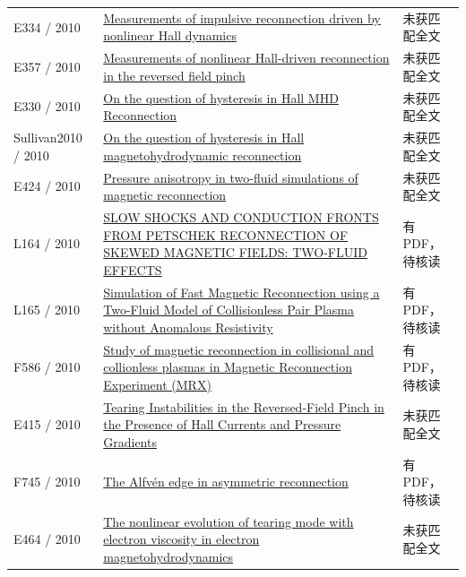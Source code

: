 \begin{longtable}{P{24mm}P{97mm}P{27mm}}
E334 / 2010 & \href{https://doi.org/10.1063/1.3521336}{Measurements of impulsive reconnection driven by nonlinear Hall dynamics} & 未获匹配全文\\

E357 / 2010 & \href{http://absimage.aps.org/image/DPP10/MWS_DPP10-2010-000419.pdf}{Measurements of nonlinear Hall-driven reconnection in the reversed field pinch} & 未获匹配全文\\

E330 / 2010 & \href{http://absimage.aps.org/image/DPP10/MWS_DPP10-2010-001121.pdf}{On the question of hysteresis in Hall MHD Reconnection} & 未获匹配全文\\

Sullivan2010 / 2010 & \href{https://doi.org/10.1063/1.3518752}{On the question of hysteresis in Hall magnetohydrodynamic reconnection} & 未获匹配全文\\

E424 / 2010 & \href{https://ui.adsabs.harvard.edu/abs/2010APS..DPPCP9139J/abstract}{Pressure anisotropy in two-fluid simulations of magnetic reconnection} & 未获匹配全文\\

L164 / 2010 & \href{https://doi.org/10.1088/0004-637x/718/2/1491}{SLOW SHOCKS AND CONDUCTION FRONTS FROM PETSCHEK RECONNECTION OF SKEWED MAGNETIC FIELDS: TWO-FLUID EFFECTS} & 有PDF，待核读\\

L165 / 2010 & \href{https://doi.org/10.48550/arxiv.1010.0222}{Simulation of Fast Magnetic Reconnection using a Two-Fluid Model of Collisionless Pair Plasma without Anomalous Resistivity} & 有PDF，待核读\\

F586 / 2010 & \href{https://doi.org/10.1017/s1743921311006508}{Study of magnetic reconnection in collisional and collionless plasmas in Magnetic Reconnection Experiment (MRX)} & 有PDF，待核读\\

E415 / 2010 & \href{http://absimage.aps.org/image/DPP10/MWS_DPP10-2010-001620.pdf}{Tearing Instabilities in the Reversed-Field Pinch in the Presence of Hall Currents and Pressure Gradients} & 未获匹配全文\\

F745 / 2010 & \href{https://doi.org/10.5194/angeo-28-1327-2010}{The Alfvén edge in asymmetric reconnection} & 有PDF，待核读\\

E464 / 2010 & \href{https://doi.org/10.1063/1.3328819}{The nonlinear evolution of tearing mode with electron viscosity in electron magnetohydrodynamics} & 未获匹配全文\\


\end{longtable}
